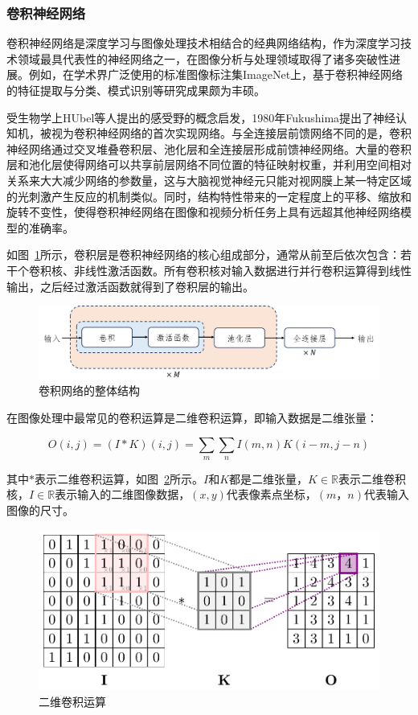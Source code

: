 \subsubsection{卷积神经网络}

卷积神经网络是深度学习与图像处理技术相结合的经典网络结构，作为深度学习技术领域最具代表性的神经网络之一，在图像分析与处理领域取得了诸多突破性进展。例如，在学术界广泛使用的标准图像标注集ImageNet上，基于卷积神经网络的特征提取与分类、模式识别等研究成果颇为丰硕。

受生物学上HUbel等人\cite{hubel1962}提出的感受野的概念启发，1980年Fukushima\cite{fukushima1980}提出了神经认知机，被视为卷积神经网络的首次实现网络。与全连接层前馈网络不同的是，卷积神经网络通过交叉堆叠卷积层、池化层和全连接层形成前馈神经网络。大量的卷积层和池化层使得网络可以共享前层网络不同位置的特征映射权重，并利用空间相对关系来大大减少网络的参数量，这与大脑视觉神经元只能对视网膜上某一特定区域的光刺激产生反应的机制类似。同时，结构特性带来的一定程度上的平移、缩放和旋转不变性，使得卷积神经网络在图像和视频分析任务上具有远超其他神经网络模型的准确率。

如图~\ref{fig:cnn}所示，卷积层是卷积神经网络的核心组成部分，通常从前至后依次包含：若干个卷积核、非线性激活函数。所有卷积核对输入数据进行并行卷积运算得到线性输出，之后经过激活函数就得到了卷积层的输出\cite{Goodfellow-et-al-2016}。

\begin{figure}
    \centering
    \includegraphics[width=\textwidth]{fig/cnn_frame.png}
    \caption{卷积网络的整体结构}
    \label{fig:cnn}
\end{figure}

在图像处理中最常见的卷积运算是二维卷积运算，即输入数据是二维张量：

\[
    O(i, j)=(I * K)(i, j)=\sum_{m} \sum_{n} I(m, n) K(i-m, j-n)
\]

其中$*$表示二维卷积运算，如图~\ref{fig:2dcnn}所示。$I$和$K$都是二维张量，$ K \in \mathbb{R}$表示二维卷积核，$I \in \mathbb{R}$表示输入的二维图像数据，$(x, y)$代表像素点坐标，$(m，n)$代表输入图像的尺寸。

\begin{figure}[htbp]
    \centering
    \includegraphics[width=\textwidth]{fig/2dcnn-1.png}
    \caption{二维卷积运算}
    \label{fig:2dcnn}
\end{figure}

